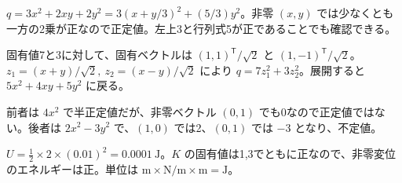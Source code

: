 \documentclass[11pt]{article}
\begin{document}

\problem[展開と平方完成]
\begin{ans}
$q=3x^2+2xy+2y^2=3(x+y/3)^2+(5/3)y^2$。非零 $(x,y)$ では少なくとも一方の2乗が正なので正定値。左上3と行列式5が正であることでも確認できる。
\end{ans}

\problem[主軸変換]
\begin{ans}
固有値7と3に対して、固有ベクトルは $(1,1)^{\mathsf T}/\sqrt2$ と $(1,-1)^{\mathsf T}/\sqrt2$。$z_1=(x+y)/\sqrt2,\ z_2=(x-y)/\sqrt2$ により $q=7z_1^2+3z_2^2$。展開すると $5x^2+4xy+5y^2$ に戻る。
\end{ans}
\newpage

\problem[符号の分類]
\begin{ans}
前者は $4x^2$ で半正定値だが、非零ベクトル $(0,1)$ でも0なので正定値ではない。後者は $2x^2-3y^2$ で、$(1,0)$ では2、$(0,1)$ では $-3$ となり、不定値。
\end{ans}

\problem[ばねのエネルギー]
\begin{ans}
$U=\frac12\times2\times(0.01)^2=0.0001\ \mathrm J$。$K$ の固有値は1,3でともに正なので、非零変位のエネルギーは正。単位は $\mathrm{m}\times\mathrm{N/m}\times\mathrm m=\mathrm J$。
\end{ans}
\end{document}
